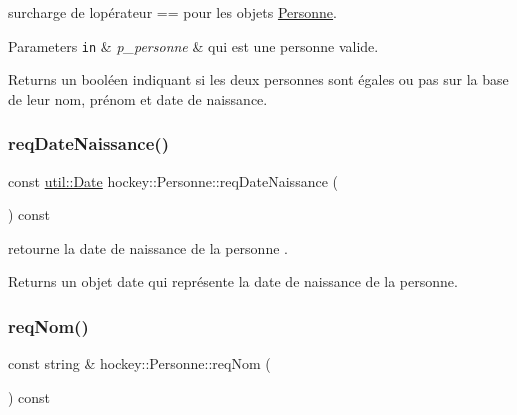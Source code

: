surcharge de l\textquotesingle{}opérateur == pour les objets \hyperlink{classhockey_1_1Personne}{Personne}. 


\begin{DoxyParams}[1]{Parameters}
\mbox{\tt in}  & {\em p\+\_\+personne} & qui est une personne valide. \\
\hline
\end{DoxyParams}
\begin{DoxyReturn}{Returns}
un booléen indiquant si les deux personnes sont égales ou pas sur la base de leur nom, prénom et date de naissance. 
\end{DoxyReturn}
\mbox{\label{classhockey_1_1Personne_ae9cb2402f8012b71959846a079986308}} 
\subsubsection{\texorpdfstring{req\+Date\+Naissance()}{reqDateNaissance()}}
{\footnotesize\ttfamily const \hyperlink{classutil_1_1Date}{util\+::\+Date} hockey\+::\+Personne\+::req\+Date\+Naissance (\begin{DoxyParamCaption}{ }\end{DoxyParamCaption}) const}



retourne la date de naissance de la personne . 

\begin{DoxyReturn}{Returns}
un objet date qui représente la date de naissance de la personne. 
\end{DoxyReturn}
\mbox{\label{classhockey_1_1Personne_a0fdf8d98c481d17234c995bf67b57091}} 
\subsubsection{\texorpdfstring{req\+Nom()}{reqNom()}}
{\footnotesize\ttfamily const string \& hockey\+::\+Personne\+::req\+Nom (\begin{DoxyParamCaption}{ }\end{DoxyParamCaption}) const}



